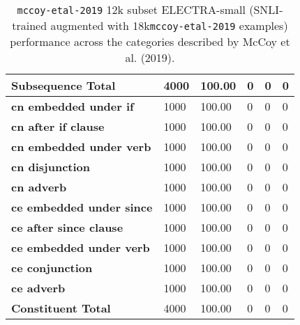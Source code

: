 \documentclass[11pt,a4paper]{article}
\begin{document}
\begin{table}[!hbt]
\begin{tabular}{p{}|p{} p{} p{} p{} p{} }
        \textbf{Subsequence Total} & 4000 & 100.00 & 0 & 0 & 0 \\
        \hline
        \textbf{cn embedded under if} & 1000 & 100.00 & 0 & 0 & 0 \\
        \textbf{cn after if clause} & 1000 & 100.00 & 0 & 0 & 0 \\
        \textbf{cn embedded under verb} & 1000 & 100.00 & 0 & 0 & 0 \\
        \textbf{cn disjunction} & 1000 & 100.00 & 0 & 0 & 0 \\
        \textbf{cn adverb} & 1000 & 100.00 & 0 & 0 & 0 \\
        \textbf{ce embedded under since} & 1000 & 100.00 & 0 & 0 & 0 \\
        \textbf{ce after since clause} & 1000 & 100.00 & 0 & 0 & 0 \\
        \textbf{ce embedded under verb} & 1000 & 100.00 & 0 & 0 & 0 \\
        \textbf{ce conjunction} & 1000 & 100.00 & 0 & 0 & 0 \\
        \textbf{ce adverb} & 1000 & 100.00 & 0 & 0 & 0 \\
        \textbf{Constituent Total} & 4000 & 100.00 & 0 & 0 & 0 \\
    \end{tabular}
    \caption{\texttt{mccoy-etal-2019} 12k subset ELECTRA-small (SNLI-trained augmented with 18k\texttt{mccoy-etal-2019} examples) performance across the categories described by McCoy et al. (2019).}
\end{table}

\end{document}
